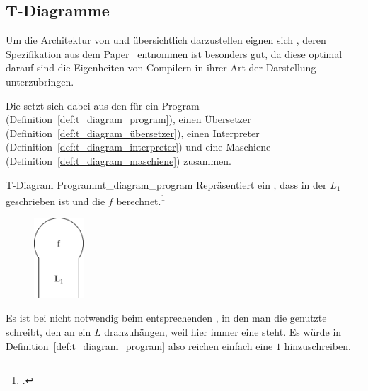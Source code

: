 
\subsection{T-Diagramme}
\label{sec:t_diagram}
Um die Architektur von  und  übersichtlich darzustellen eignen sich , deren Spezifikation aus dem Paper~\cite{earley_formalism_1970} entnommen ist besonders gut, da diese optimal darauf  sind die Eigenheiten von Compilern in ihrer Art der Darstellung unterzubringen.

Die  setzt sich dabei aus den  für ein Program (Definition~\ref{def:t_diagram_program}), einen Übersetzer (Definition~\ref{def:t_diagram_übersetzer}), einen Interpreter (Definition~\ref{def:t_diagram_interpreter}) und eine Maschiene (Definition~\ref{def:t_diagram_maschiene}) zusammen.

\begin{Definition}{T-Diagram Programm}{t_diagram_program}
  Repräsentiert ein , dass in der  $L_1$ geschrieben ist und die  $f$ berechnet.\footcite{earley_formalism_1970}
  \begin{figure}[H]
    \centering
    \includegraphics[height=3cm]{./figures/programm.png}
  \end{figure}
\end{Definition}

\begin{Special_Paragraph}
  Es ist bei  nicht notwendig beim entsprechenden , in den man die genutzte  schreibt, den  an ein $L$ dranzuhängen, weil hier immer eine  steht. Es würde in Definition~\ref{def:t_diagram_program} also reichen einfach eine $1$ hinzuschreiben.
\end{Special_Paragraph}

